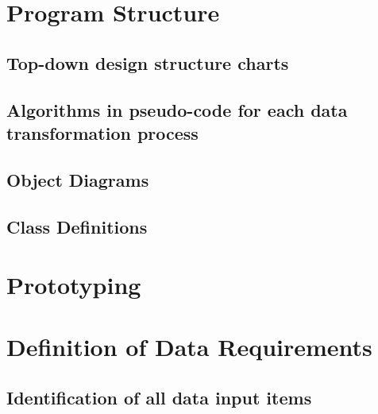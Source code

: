 \begin{itemize}
\begin{flushleft}
\section{Program Structure}


\subsection{Top-down design structure charts}

\subsection{Algorithms in pseudo-code for each data transformation process}

\subsection{Object Diagrams}

\subsection{Class Definitions}

\section{Prototyping}

\section{Definition of Data Requirements}

\subsection{Identification of all data input items}


\end{flushleft}
\end{itemize}
